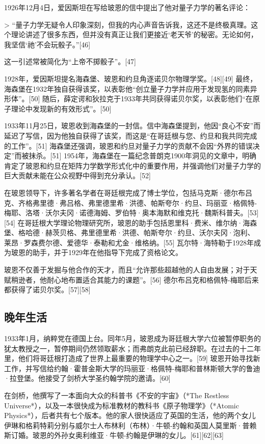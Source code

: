 1926年12月4日，爱因斯坦在写给玻恩的信中提出了他对量子力学的著名评论：

> “量子力学无疑令人印象深刻，但我的内心声音告诉我，这还不是终极真理。这个理论讲述了很多东西，但并没有真正让我们更接近‘老天爷’的秘密。无论如何，我坚信‘祂’不会玩骰子。”[46]

这一引述常被简化为“上帝不掷骰子”。[47]

1928年，爱因斯坦提名海森堡、玻恩和约旦角逐诺贝尔物理学奖。[48][49] 最终，海森堡在1932年独自获得该奖，以表彰他“创立量子力学并应用于发现氢的同素异形体”。[50] 随后，薛定谔和狄拉克于1933年共同获得诺贝尔奖，以表彰他们“在原子理论中发现新的有效形式”。[50]

1933年11月25日，玻恩收到海森堡的一封信。信中海森堡提到，他因“良心不安”而延迟了写信，因为他独自获得了该奖，而这是“在哥廷根与您、约旦和我共同完成的工作”。[51] 海森堡还强调，玻恩和约旦对量子力学的贡献不会因“外界的错误决定”而被抹杀。[51] 1954年，海森堡在一篇纪念普朗克1900年洞见的文章中，明确肯定了玻恩和约旦在矩阵力学数学形式化中的重要作用，并强调他们对量子力学的巨大贡献未能在公众视野中得到充分承认。[52]

在玻恩领导下，许多著名学者在哥廷根完成了博士学位，包括马克斯·德尔布吕克、齐格弗里德·弗吕格、弗里德里希·洪德、帕斯夸尔·约旦、玛丽亚·格佩特-梅耶、洛塔·沃尔夫冈·诺德海姆、罗伯特·奥本海默和维克托·魏斯科普夫。[53][54] 在哥廷根大学理论物理研究所，玻恩的助手包括恩里科·费米、维尔纳·海森堡、格哈德·赫茨贝格、弗里德里希·洪德、帕斯夸尔·约旦、沃尔夫冈·泡利、莱昂·罗森费尔德、爱德华·泰勒和尤金·维格纳。[55] 瓦尔特·海特勒于1928年成为玻恩的助手，并于1929年在他指导下完成了资格论文。

玻恩不仅善于发掘与他合作的天才，而且“允许那些超越他的人自由发展；对于天赋稍逊者，他耐心地布置适合其能力的课题”。[56] 德尔布吕克和格佩特-梅耶后来都获得了诺贝尔奖。[57][58]
\subsection{晚年生活}
1933年1月，纳粹党在德国上台。同年5月，玻恩成为哥廷根大学六位被暂停职务的犹太教授之一，暂停期间仍然领取薪水；而弗朗克此前已经辞职。在过去的十二年里，他们将哥廷根打造成了世界上最重要的物理学中心之一。[59] 玻恩开始寻找新工作，并写信给约翰·霍普金斯大学的玛丽亚·格佩特-梅耶和普林斯顿大学的鲁迪·拉登堡。他接受了剑桥大学圣约翰学院的邀请。[60] 

在剑桥，他撰写了一本面向大众的科普书《不安的宇宙》（*The Restless Universe*），以及一本很快成为标准教材的教科书《原子物理学》（*Atomic Physics*），后者共有七个版本。他的家人很快适应了英国的生活，他的两个女儿伊琳和格莉特莉分别与威尔士人布林利（布林）·牛顿-约翰和英国人莫里斯·普赖斯订婚。玻恩的外孙女奥利维亚·牛顿-约翰是伊琳的女儿。[61][62][63]

